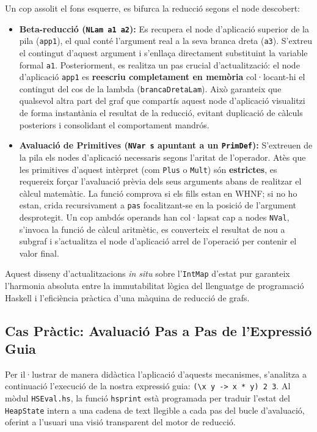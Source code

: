 Un cop assolit el fons esquerre, es bifurca la reducció segons el node descobert:
\begin{itemize}
    \item \textbf{Beta-reducció (\texttt{NLam a1 a2}):} Es recupera el node d'aplicació superior de la pila (\texttt{app1}), el qual conté l'argument real a la seva branca dreta (\texttt{a3}). S'extreu el contingut d'aquest argument i s'enllaça directament substituint la variable formal \texttt{a1}. Posteriorment, es realitza un pas crucial d'actualització: el node d'aplicació \texttt{app1} es \textbf{reescriu completament en memòria} col·locant-hi el contingut del cos de la lambda (\texttt{brancaDretaLam}). Això garanteix que qualsevol altra part del graf que compartís aquest node d'aplicació visualitzi de forma instantània el resultat de la reducció, evitant duplicació de càlculs posteriors i consolidant el comportament mandrós.
    \item \textbf{Avaluació de Primitives (\texttt{NVar s} apuntant a un \texttt{PrimDef}):} S'extreuen de la pila els nodes d'aplicació necessaris segons l'aritat de l'operador. Atès que les primitives d'aquest intèrpret (com \texttt{Plus} o \texttt{Mult}) són \textbf{estrictes}, es requereix forçar l'avaluació prèvia dels seus arguments abans de realitzar el càlcul matemàtic. La funció comprova si els fills estan en WHNF; si no ho estan, crida recursivament a \texttt{pas} focalitzant-se en la posició de l'argument desprotegit. Un cop ambdós operands han col·lapsat cap a nodes \texttt{NVal}, s'invoca la funció de càlcul aritmètic, es converteix el resultat de nou a subgraf i s'actualitza el node d'aplicació arrel de l'operació per contenir el valor final.
\end{itemize}

Aquest disseny d'actualitzacions \textit{in situ} sobre l'\texttt{IntMap} d'estat pur garanteix l'harmonia absoluta entre la immutabilitat lògica del llenguatge de programació Haskell i l'eficiència pràctica d'una màquina de reducció de grafs. 

\subsection{Cas Pràctic: Avaluació Pas a Pas de l'Expressió Guia}

Per il·lustrar de manera didàctica l'aplicació d'aquests mecanismes, s'analitza a continuació l'execució de la nostra expressió guia: \texttt{(\textbackslash x y -> x * y) 2 3}. Al mòdul \texttt{HSEval.hs}, la funció \texttt{hsprint} està programada per traduir l'estat del \texttt{HeapState} intern a una cadena de text llegible a cada pas del bucle d'avaluació, oferint a l'usuari una visió transparent del motor de reducció.


